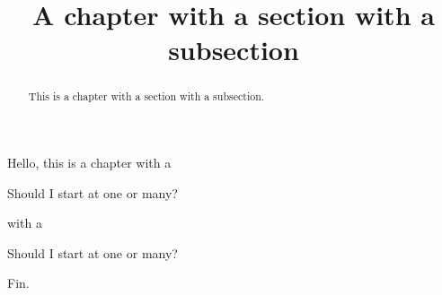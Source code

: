 \documentclass{ximera}
\title{A chapter with a section with a subsection}
\begin{document}
\begin{abstract}
  This is a chapter with a section with a subsection.
\end{abstract}
\maketitle




Hello, this is a chapter with a

\begin{theorem}
  Should I start at one or many?
\end{theorem}
with a

\begin{theorem}
  Should I start at one or many?
\end{theorem}

Fin.
\end{document}

